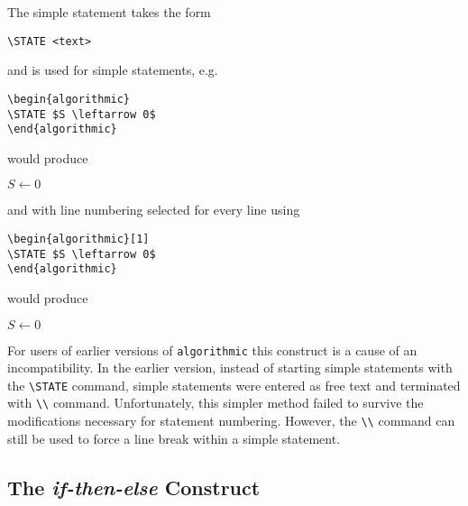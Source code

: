 \documentclass[letterpaper]{article}
\newcommand{\keyword}[1]{\texttt{#1}}
\begin{document}
The simple statement takes the form
\begin{verbatim}
\STATE <text>
\end{verbatim}
and is used for simple statements, e.g.
\begin{verbatim}
\begin{algorithmic}
\STATE $S \leftarrow 0$
\end{algorithmic}
\end{verbatim}
would produce
\begin{algorithmic}
  \STATE $S \leftarrow 0$
\end{algorithmic}
and with line numbering selected for every line using
\begin{verbatim}
\begin{algorithmic}[1]
\STATE $S \leftarrow 0$
\end{algorithmic}
\end{verbatim}
would produce
\begin{algorithmic}[1]
  \STATE $S \leftarrow 0$
\end{algorithmic}
For users of earlier versions of \keyword{algorithmic} this construct is
a cause of an incompatibility.  In the earlier version, instead of
starting simple statements with the \verb+\STATE+ command, simple
statements were entered as free text and terminated with \verb+\\+
command.  Unfortunately, this simpler method failed to survive the
modifications necessary for statement numbering.  However, the \verb+\\+
command can still be used to force a line break within a simple
statement.

\subsection{The \emph{if-then-else} Construct}
\end{document}
